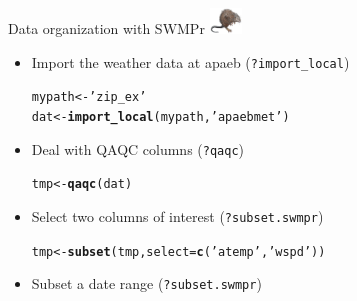 \documentclass[xcolor=dvipsnames,serif]{beamer}\usepackage[]{graphicx}\usepackage[]{color}
\makeatletter
\newcommand{\hlstr}[1]{\textcolor[rgb]{0.192,0.494,0.8}{#1}}%
\newcommand{\hlstd}[1]{\textcolor[rgb]{0.345,0.345,0.345}{#1}}%
\newcommand{\hlkwb}[1]{\textcolor[rgb]{0.69,0.353,0.396}{#1}}%
\newcommand{\hlkwc}[1]{\textcolor[rgb]{0.333,0.667,0.333}{#1}}%
\newcommand{\hlkwd}[1]{\textcolor[rgb]{0.737,0.353,0.396}{\textbf{#1}}}%
\newenvironment{kframe}{%
 \def\at@end@of@kframe{}%
 \ifinner\ifhmode%
  \def\at@end@of@kframe{\end{minipage}}%
  \begin{minipage}{\columnwidth}%
 \fi\fi%
 \def\FrameCommand##1{\hskip\@totalleftmargin \hskip-\fboxsep
 \colorbox{shadecolor}{##1}\hskip-\fboxsep
     \hskip-\linewidth \hskip-\@totalleftmargin \hskip\columnwidth}%
 \MakeFramed {\advance\hsize-\width
   \@totalleftmargin\z@ \linewidth\hsize
   \@setminipage}}%
 {\par\unskip\endMakeFramed%
 \at@end@of@kframe}
\newenvironment{knitrout}{}{} %
\makeatother
\begin{document}
\begin{frame}[fragile]{Data organization with SWMPr \includegraphics[width = 0.065\textwidth]{imgs/swmprat.png}}
\begin{itemize}
\item {}
Import the weather data at apaeb (\texttt{?import\_local})
\begin{knitrout}\scriptsize
{}\color{fgcolor}\begin{kframe}
\begin{alltt}
\hlstd{mypath} \hlkwb{<-} \hlstr{'zip_ex'}
\hlstd{dat} \hlkwb{<-} \hlkwd{import_local}\hlstd{(mypath,} \hlstr{'apaebmet'}\hlstd{)}
\end{alltt}
\end{kframe}
\end{knitrout}
\vspace{0.1in}
\item {}
Deal with QAQC columns (\texttt{?qaqc})
\begin{knitrout}\scriptsize
{}\color{fgcolor}\begin{kframe}
\begin{alltt}
\hlstd{tmp} \hlkwb{<-} \hlkwd{qaqc}\hlstd{(dat)}
\end{alltt}
\end{kframe}
\end{knitrout}
\vspace{0.1in}
\item {}
Select two columns of interest (\texttt{?subset.swmpr})
\begin{knitrout}\scriptsize
{}\color{fgcolor}\begin{kframe}
\begin{alltt}
\hlstd{tmp} \hlkwb{<-} \hlkwd{subset}\hlstd{(tmp,} \hlkwc{select} \hlstd{=} \hlkwd{c}\hlstd{(}\hlstr{'atemp'}\hlstd{,} \hlstr{'wspd'}\hlstd{))}
\end{alltt}
\end{kframe}
\end{knitrout}
\vspace{0.1in}
\item {}
Subset a date range (\texttt{?subset.swmpr})
\begin{knitrout}\scriptsize

\end{knitrout}
\end{itemize}
\end{frame}
\end{document}
